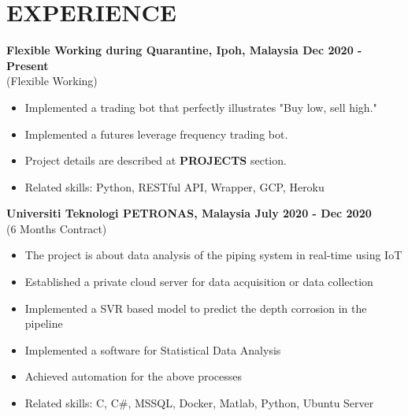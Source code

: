 \vspace{0.3cm}
\section{EXPERIENCE}

\textbf{Flexible Working during Quarantine, Ipoh, Malaysia
\hfill{Dec 2020 - Present}} \vspace{0.1cm} \\
 {(Flexible Working)} \vspace{0.15cm}
    \begin{itemize}
        \item Implemented a trading bot that perfectly illustrates "Buy low, sell high."
        \item Implemented a futures leverage frequency trading bot.
        \item Project details are described at \textbf{PROJECTS} section.
        \item Related skills: Python, RESTful API, Wrapper, GCP, Heroku 
    \end{itemize}

\textbf{Universiti Teknologi PETRONAS, Malaysia
\hfill{July 2020 - Dec 2020}} \vspace{0.1cm} \\
 {(6 Months Contract)} \vspace{0.15cm}
    \begin{itemize}
        \item The project is about data analysis of the piping system in real-time using IoT
        \item Established a private cloud server for data acquisition or data collection
        \item Implemented a SVR based model to predict the depth corrosion in the pipeline
        \item Implemented a software for Statistical Data Analysis 
        \item Achieved automation for the above processes
        \item Related skills: C, C\#, MSSQL, Docker, Matlab, Python, Ubuntu Server
    \end{itemize}
    
